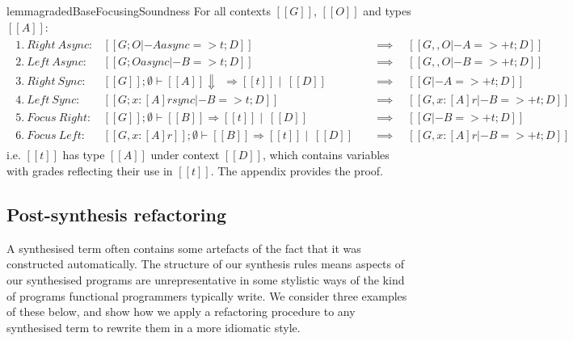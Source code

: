 \begin{restatable}{lemma}{gradedBaseFocusingSoundness}
  For all contexts $[[ G ]]$, $[[ O ]]$ and types $[[ A ]]$:
  \begin{align*}
  \begin{array}{lll}
   1.\ Right\ Async: & [[ G ; O |- A async => t ; D ]] \quad &\implies \quad [[ G ,, O |- A =>+ t ; D ]]\\
   2.\ Left\ Async: & [[ G ; O async |- B => t ; D ]] \quad &\implies \quad [[ G ,, O |- B =>+ t ; D ]]\\
   3.\ Right\ Sync: & [[ G ]] ; \emptyset \vdash [[ A ]] \Downarrow\ \ \Rightarrow [[ t ]] \mid\  [[ D ]] \quad &\implies \quad [[ G |- A =>+ t ; D ]]\\
   4.\ Left\ Sync: & [[ G ; {x : [A] r} sync |- B => t ; D ]] \quad &\implies \quad [[ G, x : [ A] r |- B =>+ t ; D ]]\\
   5.\ Focus\ Right: & [[ G ]] ; \emptyset \vdash [[ B]] \Rightarrow [[ t]] \mid\ [[ D ]] \quad &\implies \quad [[ G |- B =>+ t ; D ]]\\
   6.\ Focus\ Left: & [[ G, x : [A] r ]] ; \emptyset \vdash [[ B]] \Rightarrow [[t ]] \mid\ [[ D ]] \quad &\implies \quad [[ G, x : [A ] r |- B =>+ t ; D ]]
  \end{array}
  \end{align*}
i.e. $[[ t ]]$ has type $[[ A ]]$
under context $[[ D ]]$,
which contains variables with grades reflecting their use in $[[ t ]]$.
The appendix provides the proof.
  \end{restatable}




\subsection{Post-synthesis refactoring}
\label{sec:refactoring}

A synthesised term often contains some artefacts of the fact that it was
constructed automatically. The structure of our synthesis rules means aspects of
our synthesised programs are unrepresentative in some stylistic ways of the kind
of programs functional programmers typically write. We consider three examples
of these below, and show how we apply a refactoring procedure to any synthesised
term to rewrite them in a more idiomatic style.
